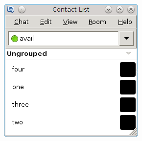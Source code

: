 \documentclass{beamer}
\begin{document}
\begin{frame}[fragile]
\begin{columns}
    \begin{column}{0.63\textwidth}
    \begin{figure}[htb]
    \includegraphics[width=\textwidth]{empathy_list.png}
    \end{figure}
    \end{column}

    \end{columns}
\end{frame}
\end{document}
